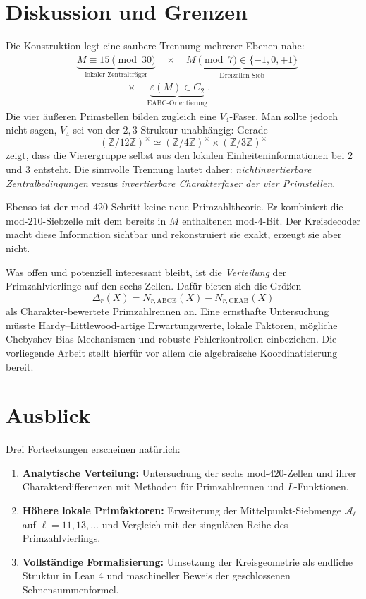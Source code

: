 \documentclass[11pt,a4paper]{article}
\theoremstyle{definition}
\theoremstyle{remark}
\newcommand{\Z}{\mathbb Z}
\newcommand{\eps}{\varepsilon}
\newcommand{\ABCE}{\mathrm{ABCE}}
\newcommand{\CEAB}{\mathrm{CEAB}}
\begin{document}
\section{Diskussion und Grenzen}

Die Konstruktion legt eine saubere Trennung mehrerer Ebenen nahe:
\[
\begin{aligned}
&\underbrace{M\equiv15\pmod{30}}_{\text{lokaler Zentralträger}}
\quad\times\quad
\underbrace{M\pmod7\in\{-1,0,+1\}}_{\text{Dreizellen-Sieb}}\\
&\hspace{5em}\times\quad
\underbrace{\eps(M)\in C_2}_{\text{EABC-Orientierung}}.
\end{aligned}
\]
Die vier äußeren Primstellen bilden zugleich eine $V_4$-Faser. Man sollte jedoch nicht sagen, $V_4$ sei von der $2,3$-Struktur unabhängig: Gerade
\[
(\Z/12\Z)^\times\simeq(\Z/4\Z)^\times\times(\Z/3\Z)^\times
\]
zeigt, dass die Vierergruppe selbst aus den lokalen Einheiteninformationen bei $2$ und $3$ entsteht. Die sinnvolle Trennung lautet daher: \emph{nichtinvertierbare Zentralbedingungen} versus \emph{invertierbare Charakterfaser der vier Primstellen}.

Ebenso ist der mod-$420$-Schritt keine neue Primzahltheorie. Er kombiniert die mod-$210$-Siebzelle mit dem bereits in $M$ enthaltenen mod-$4$-Bit. Der Kreisdecoder macht diese Information sichtbar und rekonstruiert sie exakt, erzeugt sie aber nicht.

Was offen und potenziell interessant bleibt, ist die \emph{Verteilung} der Primzahlvierlinge auf den sechs Zellen. Dafür bieten sich die Größen
\[
\Delta_r(X)=N_{r,\ABCE}(X)-N_{r,\CEAB}(X)
\]
als Charakter-bewertete Primzahlrennen an. Eine ernsthafte Untersuchung müsste Hardy--Littlewood-artige Erwartungswerte, lokale Faktoren, mögliche Chebyshev-Bias-Mechanismen und robuste Fehlerkontrollen einbeziehen. Die vorliegende Arbeit stellt hierfür vor allem die algebraische Koordinatisierung bereit.

\section{Ausblick}

Drei Fortsetzungen erscheinen natürlich:

\begin{enumerate}
\item \textbf{Analytische Verteilung:} Untersuchung der sechs mod-$420$-Zellen und ihrer Charakterdifferenzen mit Methoden für Primzahlrennen und $L$-Funktionen.
\item \textbf{Höhere lokale Primfaktoren:} Erweiterung der Mittelpunkt-Siebmenge $\mathcal A_\ell$ auf $\ell=11,13,\ldots$ und Vergleich mit der singulären Reihe des Primzahlvierlings.
\item \textbf{Vollständige Formalisierung:} Umsetzung der Kreisgeometrie als endliche Struktur in Lean 4 und maschineller Beweis der geschlossenen Sehnensummenformel.
\end{enumerate}
\end{document}
